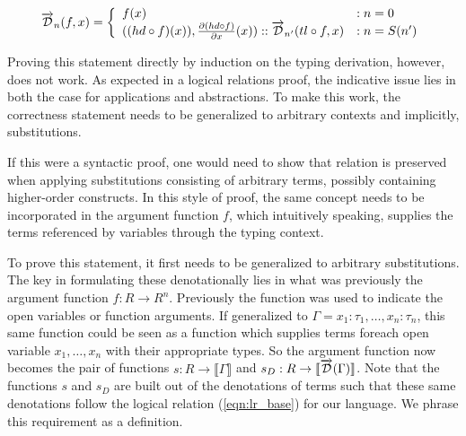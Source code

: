   \begin{equation}
    \overrightarrow{\mathcal{D}}_n(f, x) =
      \left\{
        \begin{array}{ll}
          f(x) & : n = 0 \\
          ((hd \circ f)(x)), \frac{\partial{(hd \circ f)}}{\partial{x}}(x)) :: \overrightarrow{\mathcal{D}}_{n'}(tl \circ f, x) & : n = S(n') \\
        \end{array}
      \right.
  \label{eqn:argument_df}
  \end{equation}

  Proving this statement directly by induction on the typing derivation, however, does not work.
  As expected in a logical relations proof, the indicative issue lies in both the case for applications and abstractions.
  To make this work, the correctness statement needs to be generalized to arbitrary contexts and implicitly, substitutions.

  If this were a syntactic proof, one would need to show that relation is preserved when applying substitutions consisting of arbitrary terms, possibly containing higher-order constructs.
  In this style of proof, the same concept needs to be incorporated in the argument function $f$, which intuitively speaking, supplies the terms referenced by variables through the typing context.


  To prove this statement, it first needs to be generalized to arbitrary substitutions.
  The key in formulating these denotationally lies in what was previously the argument function $f : R \rightarrow R^n$.
  Previously the function was used to indicate the open variables or function arguments.
  If generalized to $\Gamma = x_1 : \tau_1, \dots, x_n : \tau_n$, this same function could be seen as a function which supplies terms foreach open variable $x_1, \dots, x_n$ with their appropriate types.
  So the argument function now becomes the pair of functions $s : R \rightarrow \llbracket \Gamma \rrbracket$ and $s_D : R \rightarrow \llbracket \overrightarrow{\mathcal{D}}(\Gamma) \rrbracket$.
  Note that the functions $s$ and $s_D$ are built out of the denotations of terms such that these same denotations follow the logical relation (\ref{eqn:lr_base}) for our language.
  We phrase this requirement as a definition.

